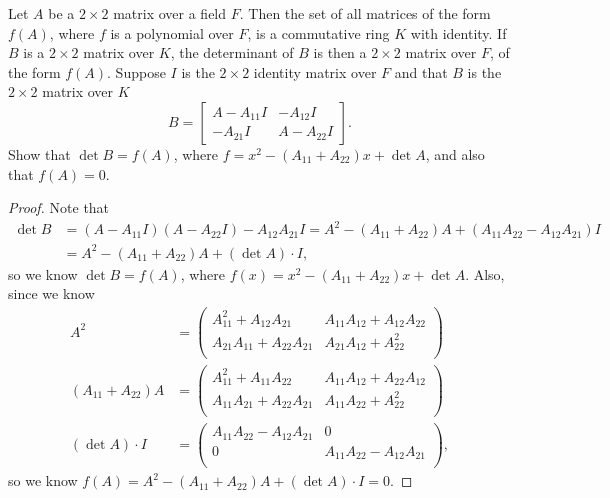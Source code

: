 \begin{problem}
Let $A$ be a $2 \times 2$ matrix over a field $F$. Then the set of all matrices of the form $f(A)$, where $f$ is a polynomial over $F$, is a commutative ring $K$ with identity. If $B$ is a $2 \times 2$ matrix over $K$, the determinant of $B$ is then a $2 \times 2$ matrix over $F$, of the form $f(A)$. Suppose $I$ is the $2 \times 2$ identity matrix over $F$ and that $B$ is the $2 \times 2$ matrix over $K$
\[
B = 
\begin{bmatrix}
A - A_{11}I & -A_{12}I \\
-A_{21}I & A - A_{22}I
\end{bmatrix}.
\]
Show that $\det B = f(A)$, where $f = x^2 - (A_{11} + A_{22})x + \det A$, and also that $f(A) = 0$.
\end{problem}
\begin{proof}
    Note that 
    \begin{align*}
        \det B &= (A - A_{11} I)(A - A_{22} I) - A_{12} A_{21} I = A^2 - (A_{11} + A_{22}  ) A + (A_{11} A_{22} - A_{12} A_{21}  )I \\
        &= A^2 - (A_{11} + A_{22})A + (\det A) \cdot I, 
    \end{align*}
    so we know \(\det B = f(A)\), where \(f(x) = x^2 - (A_{11} + A_{22}  )x + \det A\). Also, since we know 
    \begin{align*}
        A^2 &= \begin{pmatrix}
            A_{11}^2 + A_{12} A_{21} & A_{11} A_{12} + A_{12} A_{22}  \\
            A_{21} A_{11} + A_{22} A_{21} & A_{21} A_{12} + A_{22}^2  \\
        \end{pmatrix} \\
        (A_{11} + A_{22})A &= \begin{pmatrix}
            A_{11}^2 + A_{11}A_{22} & A_{11} A_{12} + A_{22} A_{12}  \\
            A_{11} A_{21} + A_{22} A_{21} & A_{11} A_{22} + A_{22}^2  \\
        \end{pmatrix} \\
        (\det A) \cdot I &= \begin{pmatrix}
            A_{11} A_{22} - A_{12} A_{21}   &  0 \\
            0 & A_{11} A_{22} - A_{12} A_{21}  \\
        \end{pmatrix},
    \end{align*}
    so we know \(f(A) = A^2 - (A_{11} + A_{22})A + (\det A) \cdot I = 0\).   
\end{proof}

